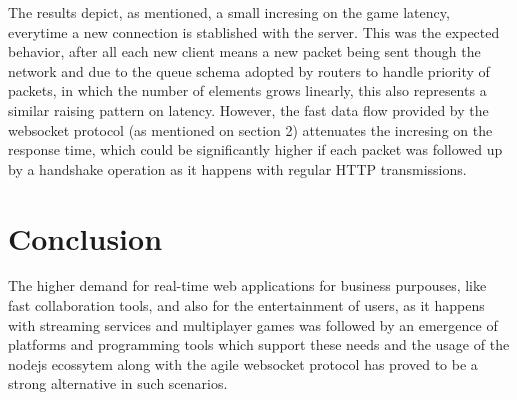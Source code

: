 \documentclass[english]{sbrt}
\begin{document}
The results depict, as mentioned, a small incresing on the game latency, everytime a new connection is stablished with the server. This was the expected behavior, after all each new client means a new packet being sent though the network and due to the queue schema adopted by routers to handle priority of packets, in which the number of elements grows linearly, this also represents a similar raising pattern on latency. However, the fast data flow provided by the websocket protocol (as mentioned on section 2) attenuates the incresing on the response time, which could be significantly higher if each packet was followed up by a handshake operation as it happens with regular HTTP transmissions.

\section{\textbf{Conclusion}}

The higher demand for real-time web applications for business purpouses, like fast collaboration tools, and also for the entertainment of users, as it happens with streaming services and multiplayer games was followed by an emergence of platforms and programming tools which support these needs and the usage of the nodejs ecossytem along with the agile websocket protocol has proved to be a strong alternative in such scenarios.

\cite{chen2011framework}



\end{document}
